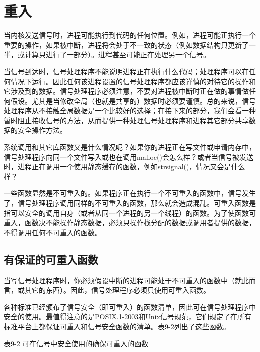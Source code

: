 \section{重入}

当内核发送信号时，进程可能执行到代码的任何位置。例如，进程可能正执行一个重要的操作，如果被中断，进程将会处于不一致的状态（例如数据结构只更新了一半，或计算只进行了一部分）。进程甚至可能正在处理另一个信号。

当信号到达时，信号处理程序不能说明进程正在执行什么代码；处理程序可以在任何情况下运行。因此任何该进程设置的信号处理程序都应该谨慎的对待它的操作和它涉及到的数据。信号处理程序必须注意，不要对进程被中断时正在做的事情做任何假设。尤其是当修改全局（也就是共享的）数据时必须要谨慎。总的来说，信号处理程序从不接触全局数据是一个比较好的选择；在接下来的部分，我们会看一种暂时阻止接收信号的方法，从而提供一种处理信号处理程序和进程其它部分共享数据的安全操作方法。

系统调用和其它库函数又是什么情况呢？如果你的进程正在写文件或申请内存中，信号处理程序向同一个文件写入或也在调用malloc()会怎么样？或者当信号被发送时，进程正在调用一个使用静态缓存的函数，例如strsignal()，情况又会是什么样？

一些函数显然是不可重入的。如果程序正在执行一个不可重入的函数中，信号发生了，信号处理程序调用同样的不可重入的函数，那么就会造成混乱。可重入函数是指可以安全的调用自身（或者从同一个进程的另一个线程）的函数。为了使函数可重入，函数决不能操作静态数据，必须只操作栈分配的数据或调用者提供的数据，不得调用任何不可重入的函数。

\subsection{有保证的可重入函数}

当写信号处理程序时，你必须假设中断的进程可能处于不可重入的函数中（就此而言，或其它的东西）。因此，信号处理程序必须只使用可重入函数。

各种标准已经颁布了信号安全（即可重入）的函数清单，因此可在信号处理程序中安全的使用。最值得注意的是POSIX.1-2003和Unix信号规范，它们规定了在所有标准平台上都保证可重入和信号安全函数的清单。表9-2列出了这些函数。

表9-2 可在信号中安全使用的确保可重入的函数

